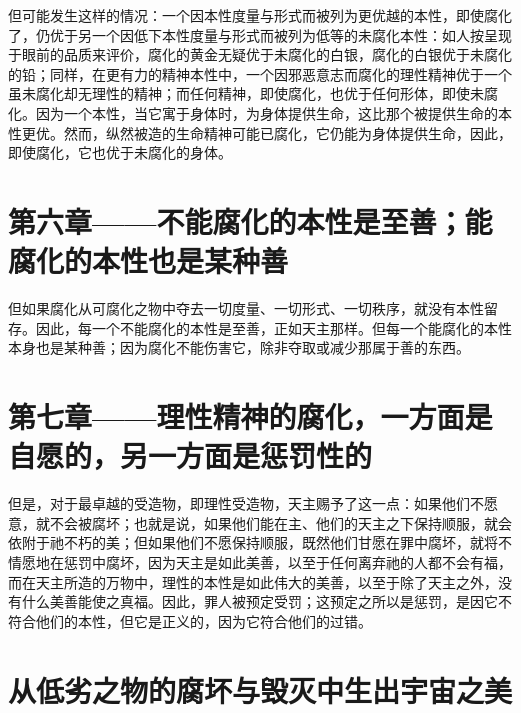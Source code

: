 但可能发生这样的情况：一个因本性度量与形式而被列为更优越的本性，即使腐化了，仍优于另一个因低下本性度量与形式而被列为低等的未腐化本性：如人按呈现于眼前的品质来评价，腐化的黄金无疑优于未腐化的白银，腐化的白银优于未腐化的铅；同样，在更有力的精神本性中，一个因邪恶意志而腐化的理性精神优于一个虽未腐化却无理性的精神；而任何精神，即使腐化，也优于任何形体，即使未腐化。因为一个本性，当它寓于身体时，为身体提供生命，这比那个被提供生命的本性更优。然而，纵然被造的生命精神可能已腐化，它仍能为身体提供生命，因此，即使腐化，它也优于未腐化的身体。\par


\section{第六章——不能腐化的本性是至善；能腐化的本性也是某种善}

但如果腐化从可腐化之物中夺去一切度量、一切形式、一切秩序，就没有本性留存。因此，每一个不能腐化的本性是至善，正如天主那样。但每一个能腐化的本性本身也是某种善；因为腐化不能伤害它，除非夺取或减少那属于善的东西。\par


\section{第七章——理性精神的腐化，一方面是自愿的，另一方面是惩罚性的}

但是，对于最卓越的受造物，即理性受造物，天主赐予了这一点：如果他们不愿意，就不会被腐坏；也就是说，如果他们能在主、他们的天主之下保持顺服，就会依附于祂不朽的美；但如果他们不愿保持顺服，既然他们甘愿在罪中腐坏，就将不情愿地在惩罚中腐坏，因为天主是如此美善，以至于任何离弃祂的人都不会有福，而在天主所造的万物中，理性的本性是如此伟大的美善，以至于除了天主之外，没有什么美善能使之真福。因此，罪人被预定受罚；这预定之所以是惩罚，是因它不符合他们的本性，但它是正义的，因为它符合他们的过错。\par


\section{从低劣之物的腐坏与毁灭中生出宇宙之美}

